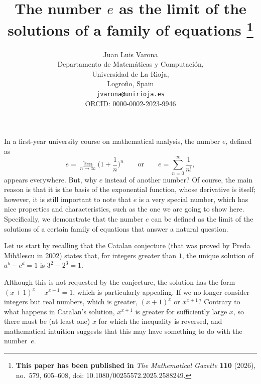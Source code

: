 \documentclass[11pt, a4paper]{article}
\title{The number $e$ as the limit of the solutions of a family of equations%
\footnote{\textbf{This paper has been published in} \textit{The Mathematical Gazette} \textbf{110} (2026), no.~579, 605--608, doi: 10.1080/00255572.2025.2588249.}}
\author{Juan Luis Varona\\[4pt]
\small Departamento de Matem\'aticas y Computaci\'on,\\[-1pt]
\small Universidad de La Rioja,\\[-1pt]
\small Logro\~no, Spain\\[2pt]
\small \texttt{jvarona@unirioja.es}\\[2pt]
\small ORCID: {0000-0002-2023-9946}}
\date{}     %
\begin{document}
\maketitle

In a first-year university course on mathematical analysis, the number $e$, defined as
\[
e = \lim_{n\to\infty} \Big(1+\frac{1}{n}\Big)^n
\qquad \text{or} \qquad
e = \sum_{n=0}^{\infty} \frac{1}{n!},
\]
appears everywhere. But, why $e$ instead of another number? 
Of course, the main reason is that it is the basis of the exponential function, whose derivative is itself; however, it is still important to note that $e$ is a very special number, which has nice properties and characteristics, such as the one we are going to show here. Specifically, we demonstrate that the number $e$ can be defined as the limit of the solutions of a certain family of equations that answer a natural question.

Let us start by recalling that the Catalan conjecture (that was proved by Preda Mih\u{a}lescu in 2002) states that, for integers greater than $1$, the unique solution of $a^b - c^d = 1$ is $3^2 - 2^3 = 1$.

Although this is not requested by the conjecture, the solution has the form $(x+1)^x - x^{x+1} = 1$, which is particularly appealing. If we no longer consider integers but real numbers, which is greater, $(x+1)^x$ or $x^{x+1}$? 
Contrary to what happens in Catalan's solution, $x^{x+1}$ is greater for sufficiently large $x$, so there must be (at least one) $x$ for which the inequality is reversed, and mathematical intuition suggests that this may have something to do with the number~$e$.
\end{document}
